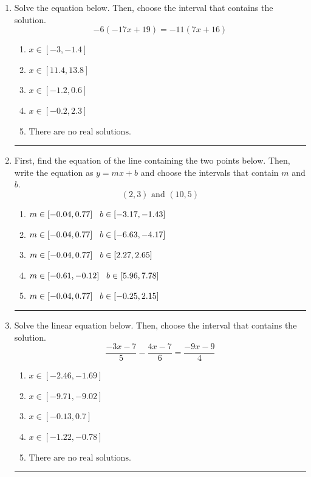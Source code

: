 \documentclass[14pt]{extbook}
\newcommand{\litem}[1]{\item#1\hspace*{-1cm}\rule{\textwidth}{0.4pt}}
\begin{document}
\begin{enumerate}
{\begin{enumerate}[label=\Alph*.]
\end{enumerate} }
\litem{
Solve the equation below. Then, choose the interval that contains the solution.\[ -6(-17x + 19) = -11(7x + 16) \]\begin{enumerate}[label=\Alph*.]
\item \( x \in [-3, -1.4] \)
\item \( x \in [11.4, 13.8] \)
\item \( x \in [-1.2, 0.6] \)
\item \( x \in [-0.2, 2.3] \)
\item \( \text{There are no real solutions.} \)

\end{enumerate} }
\litem{
First, find the equation of the line containing the two points below. Then, write the equation as $ y=mx+b $ and choose the intervals that contain $m$ and $b$.\[ (2, 3) \text{ and } (10, 5) \]\begin{enumerate}[label=\Alph*.]
\item \( m \in [-0.04, 0.77] \hspace*{3mm} b \in [-3.17, -1.43] \)
\item \( m \in [-0.04, 0.77] \hspace*{3mm} b \in [-6.63, -4.17] \)
\item \( m \in [-0.04, 0.77] \hspace*{3mm} b \in [2.27, 2.65] \)
\item \( m \in [-0.61, -0.12] \hspace*{3mm} b \in [5.96, 7.78] \)
\item \( m \in [-0.04, 0.77] \hspace*{3mm} b \in [-0.25, 2.15] \)

\end{enumerate} }
\litem{
Solve the linear equation below. Then, choose the interval that contains the solution.\[ \frac{-3x -7}{5} - \frac{4x -7}{6} = \frac{-9x -9}{4} \]\begin{enumerate}[label=\Alph*.]
\item \( x \in [-2.46, -1.69] \)
\item \( x \in [-9.71, -9.02] \)
\item \( x \in [-0.13, 0.7] \)
\item \( x \in [-1.22, -0.78] \)
\item \( \text{There are no real solutions.} \)


\end{enumerate}}
\end{enumerate}
\end{document}

